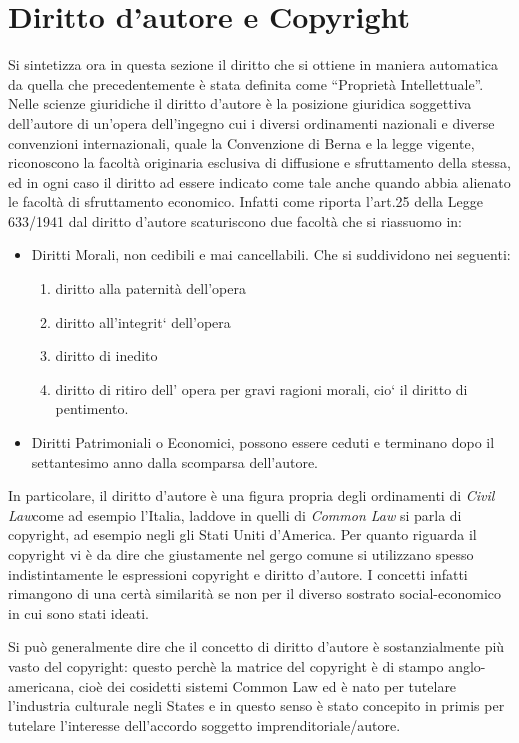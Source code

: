 \section{Diritto d'autore e Copyright}
Si sintetizza ora in questa sezione il diritto che si ottiene in maniera automatica da quella che precedentemente è stata definita come ``Proprietà Intellettuale''.
Nelle scienze giuridiche il diritto d'autore è la posizione giuridica soggettiva dell'autore di un'opera dell'ingegno cui i diversi ordinamenti nazionali e diverse convenzioni internazionali, quale la Convenzione di Berna e la legge vigente, riconoscono la facoltà originaria esclusiva di diffusione e sfruttamento della stessa, ed in ogni caso il diritto ad essere indicato come tale anche quando abbia alienato le facoltà di sfruttamento economico.
Infatti come riporta l'art.25 della Legge 633/1941 dal diritto d'autore scaturiscono due facoltà che si riassuomo in:
\begin{itemize}
 \item Diritti Morali, non cedibili e mai cancellabili. Che si suddividono nei seguenti:

\begin{enumerate}
\item diritto alla paternità dell’opera
\item diritto all’integrit` dell’opera
\item diritto di inedito
\item diritto di ritiro dell’ opera per gravi ragioni morali, cio` il diritto di pentimento.
\end{enumerate}

 \item Diritti Patrimoniali o Economici, possono essere ceduti e terminano dopo il settantesimo anno dalla scomparsa dell'autore.
\end{itemize}


In particolare, il diritto d'autore è una figura propria degli ordinamenti di \textit{Civil Law}come ad esempio l'Italia, laddove in quelli di \textit{Common Law} si parla di copyright, ad esempio negli gli Stati Uniti d'America.
Per quanto riguarda il copyright vi è da dire che giustamente nel gergo comune si utilizzano spesso indistintamente le espressioni copyright e diritto d’autore. I concetti infatti rimangono di una certà similarità se non per il diverso  sostrato social-economico in cui sono stati ideati.

Si può generalmente dire che il concetto di diritto d’autore è sostanzialmente più vasto del copyright: questo perchè
la matrice del copyright è di stampo anglo-americana, cioè dei cosidetti sistemi Common Law ed è nato per tutelare l’industria culturale negli States e in questo senso è stato concepito in primis per tutelare l’interesse dell'accordo
soggetto imprenditoriale/autore. 

